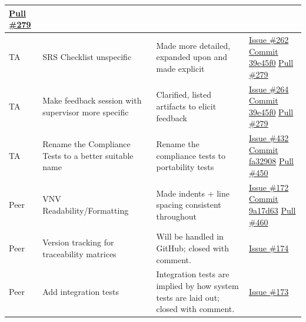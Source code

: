 \documentclass[12pt, titlepage]{article}
\begin{document}
\begin{longtable}{|p{2cm}|p{4cm}|p{5cm}|p{3cm}|}
\newline\href{https://github.com/OmarHassanAdelhamid/Five-of-a-Kind-capstone-project-/pull/279}{Pull \#279} \\ \hline
TA & SRS Checklist unspecific & Made more detailed, expanded upon and made explicit & \href{https://github.com/OmarHassanAdelhamid/Five-of-a-Kind-capstone-project-/issues/262}{Issue \#262}
\newline\href{https://github.com/OmarHassanAdelhamid/Five-of-a-Kind-capstone-project-/pull/279/commits/39e45f0ffa825d9664234e5ee6788fce38648f07}{Commit 39e45f0}
\newline\href{https://github.com/OmarHassanAdelhamid/Five-of-a-Kind-capstone-project-/pull/279}{Pull \#279} \\ \hline
TA & Make feedback session with supervisor more specific & Clarified, listed artifacts to elicit feedback & \href{https://github.com/OmarHassanAdelhamid/Five-of-a-Kind-capstone-project-/issues/264}{Issue \#264}
\newline\href{https://github.com/OmarHassanAdelhamid/Five-of-a-Kind-capstone-project-/pull/279/commits/39e45f0ffa825d9664234e5ee6788fce38648f07}{Commit 39e45f0}
\newline\href{https://github.com/OmarHassanAdelhamid/Five-of-a-Kind-capstone-project-/pull/279}{Pull \#279} \\ \hline
TA & Rename the Compliance Tests to a better suitable name & Rename the compliance tests to portability tests & \href{https://github.com/OmarHassanAdelhamid/Five-of-a-Kind-capstone-project-/issues/432}{Issue \#432}
\newline\href{https://github.com/OmarHassanAdelhamid/Five-of-a-Kind-capstone-project-/pull/450/changes/fa32908854b6ca3484e6380b5f4e9f774c8452ae}{Commit fa32908}
\newline\href{https://github.com/OmarHassanAdelhamid/Five-of-a-Kind-capstone-project-/pull/450}{Pull \#450} \\ \hline
Peer & VNV Readability/Formatting & Made indents + line spacing consistent throughout & \href{https://github.com/OmarHassanAdelhamid/Five-of-a-Kind-capstone-project-/issues/172}{Issue \#172}
\newline\href{https://github.com/OmarHassanAdelhamid/Five-of-a-Kind-capstone-project-/pull/460/commits/9a17d63126d54891faf5438eb9b9f26e7b860020}{Commit 9a17d63}
\newline\href{https://github.com/OmarHassanAdelhamid/Five-of-a-Kind-capstone-project-/pull/460}{Pull \#460} \\ \hline
Peer & Version tracking for traceability matrices & Will be handled in GitHub; closed with comment. & \href{https://github.com/OmarHassanAdelhamid/Five-of-a-Kind-capstone-project-/issues/174}{Issue \#174} \\ \hline
Peer & Add integration tests & Integration tests are implied by how system tests are laid out; closed with comment. & \href{https://github.com/OmarHassanAdelhamid/Five-of-a-Kind-capstone-project-/issues/173}{Issue \#173} \\ \hline


\end{longtable}
\end{document}
